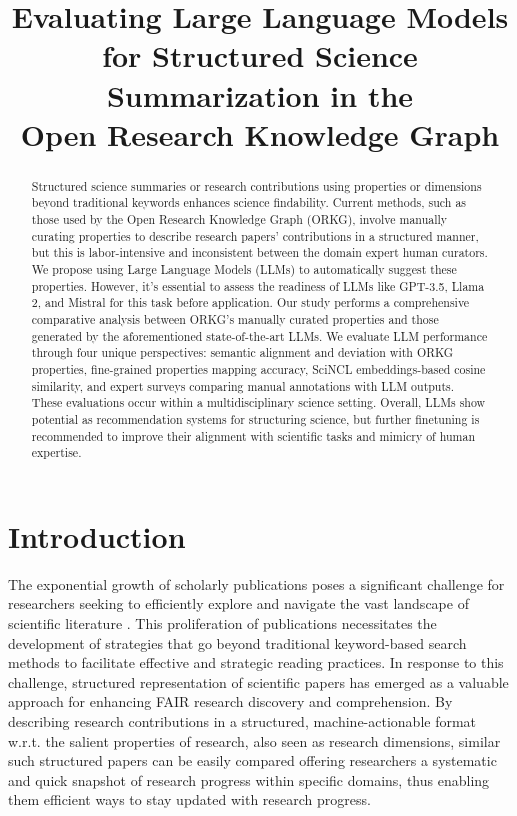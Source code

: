 
\title{Evaluating Large Language Models for Structured Science Summarization in the \\ Open Research Knowledge Graph}
\maketitle              \begin{abstract}
Structured science summaries or research contributions using properties or dimensions beyond traditional keywords enhances science findability. Current methods, such as those used by the Open Research Knowledge Graph (ORKG), involve manually curating properties to describe research papers' contributions in a structured manner, but this is labor-intensive and inconsistent between the domain expert human curators. We propose using Large Language Models (LLMs) to automatically suggest these properties. However, it's essential to assess the readiness of LLMs like GPT-3.5, Llama 2, and Mistral for this task before application. Our study performs a comprehensive comparative analysis between ORKG's manually curated properties and those generated by the aforementioned state-of-the-art LLMs. We evaluate LLM performance through four unique perspectives: semantic alignment and deviation with ORKG properties, fine-grained properties mapping accuracy, SciNCL embeddings-based cosine similarity, and expert surveys comparing manual annotations with LLM outputs. These evaluations occur within a multidisciplinary science setting. Overall, LLMs show potential as recommendation systems for structuring science, but further finetuning is recommended to improve their alignment with scientific tasks and mimicry of human expertise.

\end{abstract}

\section{Introduction}

The exponential growth of scholarly publications poses a significant challenge for researchers seeking to efficiently explore and navigate the vast landscape of scientific literature \cite{arab2022clustering}. This proliferation of publications necessitates the development of strategies that go beyond traditional keyword-based search methods to facilitate effective and strategic reading practices. In response to this challenge, structured representation of scientific papers has emerged as a valuable approach for enhancing FAIR research discovery and comprehension. By describing research contributions in a structured, machine-actionable format w.r.t. the salient properties of research, also seen as research dimensions, similar such structured papers can be easily compared offering researchers a systematic and quick snapshot of research progress within specific domains, thus enabling them efficient ways to stay updated with research progress.

